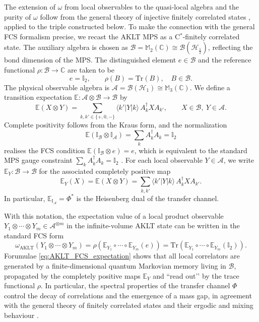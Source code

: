 \documentclass[11pt,a4paper]{article}
\def\Tr{\mathrm{Tr}}
\begin{document}
The extension of $\omega$ from local observables to the quasi-local algebra and the purity of $\omega$ follow from the general theory of injective finitely correlated states , applied to the triple constructed below.
To make the connection with the general FCS formalism precise, we recast the AKLT MPS as a C$^{*}$-finitely correlated state. The auxiliary algebra is chosen as $\mathcal{B} = \mathbb{M}_2(\mathbb{C})\cong\mathcal{B}(\mathcal{H}_{\frac{1}{2}})$, reflecting the bond dimension of the MPS. The distinguished element $e\in\mathcal{B}$ and the reference functional $\rho:\mathcal{B}\to\mathbb{C}$ are taken to be
\[
e = \mathbb{I}_2,
\qquad
\rho(B) = \Tr(B),
\quad
B\in\mathcal{B}.
\]
The physical observable algebra is $\mathcal{A}=\mathcal{B}(\mathcal{H}_{1})\cong\mathbb{M}_3(\mathbb{C})$. We define a transition expectation $\mathbb{E}:\mathcal{A}\otimes\mathcal{B}\to\mathcal{B}$ by
\begin{equation}\label{eq:E_def_AKLT}
\mathbb{E}(X\otimes Y)
=
\sum_{k,k'\in\{+,0,-\}}
\langle k'|Y|k\rangle\,A_k^{\dagger} X A_{k'},
\qquad
X\in\mathcal{B},\ Y\in\mathcal{A}.
\end{equation}
Complete positivity follows from the Kraus form, and the normalization
\[
\mathbb{E}(\mathbb{I}_{\mathcal{B}}\otimes\mathbb{I}_{\mathcal{A}})
=
\sum_{k} A_k^{\dagger} A_k
=
\mathbb{I}_2
\]
realises the FCS condition $\mathbb{E}(\mathbb{I}_{\mathcal{B}}\otimes e)=e$, which is equivalent to the standard MPS gauge constraint $\sum_k A_k^{\dagger}A_k=\mathbb{I}_2$ . For each local observable $Y\in\mathcal{A}$, we write $\mathbb{E}_Y:\mathcal{B}\to\mathcal{B}$ for the associated completely positive map
\[
\mathbb{E}_Y(X)
=
\mathbb{E}(X\otimes Y)
=
\sum_{k,k'} \langle k'|Y|k\rangle\,A_k^{\dagger} X A_{k'}.
\]
In particular, $\mathbb{E}_{\mathbb{I}_{\mathcal{A}}} = \Phi^{*}$ is the Heisenberg dual of the transfer channel.

With this notation, the expectation value of a local product observable $Y_1\otimes\cdots\otimes Y_m\in\mathcal{A}^{\otimes m}$ in the infinite-volume AKLT state can be written in the standard FCS form
\begin{equation}\label{eq:AKLT_FCS_expectation}
\omega_{\mathrm{AKLT}}(Y_1\otimes\cdots\otimes Y_m)
=
\rho\!\left(
\mathbb{E}_{Y_1}\circ\cdots\circ\mathbb{E}_{Y_m}(e)
\right)
=
\Tr\!\left(
\mathbb{E}_{Y_1}\circ\cdots\circ\mathbb{E}_{Y_m}(\mathbb{I}_2)
\right).
\end{equation}
Forumulae \eqref{eq:AKLT_FCS_expectation} shows that all local correlators are generated by a finite-dimensional quantum Markovian memory living in $\mathcal{B}$, propagated by the completely positive maps $\mathbb{E}_Y$ and “read out’’ by the trace functional $\rho$. In particular, the spectral properties of the transfer channel $\Phi$ control the decay of correlations and the emergence of a mass gap, in agreement with the general theory of finitely correlated states and their ergodic and mixing behaviour \cite{FNW92}.
\end{document}
